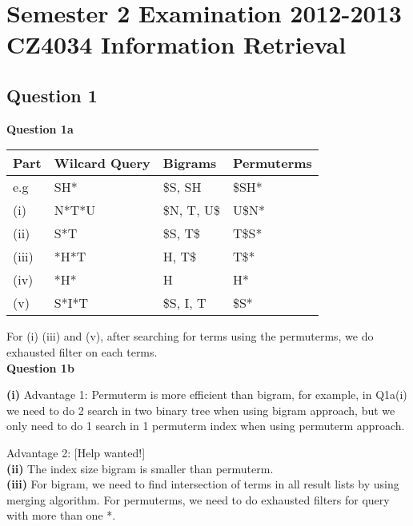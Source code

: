 \documentclass[11pt,a4paper]{report}
\begin{document}
\chapter{Semester 2 Examination 2012-2013\\CZ4034 Information Retrieval}
\begin{multicols*}{2}

\section{Question 1}

\noindent \textbf{Question 1a}

\begin{center}
\begin{tabular}{| l | l | l | l |}
    \hline
    Part      & Wilcard Query & Bigrams    & Permuterms \\
    \hline
    e.g       & SH*           & \$S, SH     & \$SH* \\
    (i)       & N*T*U         & \$N, T, U\$ & U\$N* \\
    (ii)      & S*T           & \$S, T\$    & T\$S* \\
    (iii)     & *H*T          & H, T\$      & T\$*  \\
    (iv)      & *H*           & H           & H*    \\
    (v)       & S*I*T         & \$S, I, T   & \$S*  \\
    \hline
\end{tabular}
\end{center}

\noindent For (i) (iii) and (v), after searching for terms using the permuterms, we do exhausted filter on each terms.\\

\noindent \textbf{Question 1b}

\noindent \textbf{(i)} Advantage 1: Permuterm is more efficient than bigram, for example, in Q1a(i) we need to do 2 search in two binary tree when using bigram approach, but we only need to do 1 search in 1 permuterm index when using permuterm approach.

\noindent Advantage 2: [Help wanted!]\\

\noindent \textbf{(ii)} The index size bigram is smaller than permuterm.\\

\noindent \textbf{(iii)} For bigram, we need to find intersection of terms in all result lists by using merging algorithm. For permuterms, we need to do exhausted filters for query with more than one *.\\


\end{multicols*}
\end{document}
